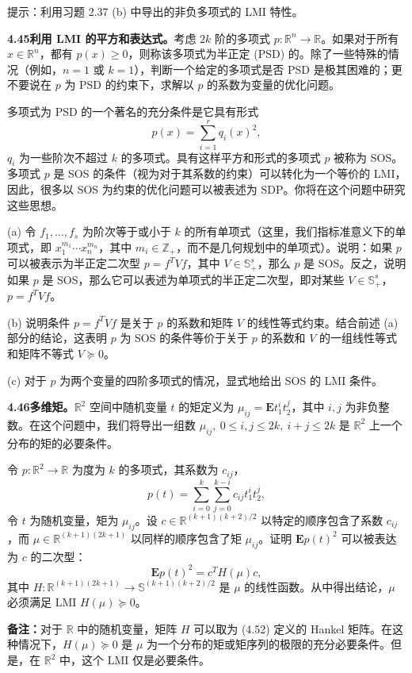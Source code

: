 \documentclass[UTF8,12pt,a4paper,fontset=fandol]{ctexart}
\begin{document}
提示：利用习题 2.37 (b) 中导出的非负多项式的 LMI 特性。

\noindent\textbf{4.45\quad 利用 LMI 的平方和表达式。}\quad 考虑 $2k$ 阶的多项式 $p:\mathbb{R}^n\to\mathbb{R}$。如果对于所有 $x\in\mathbb{R}^n$，都有 $p(x)\geq0$，则称该多项式为半正定 (PSD) 的。除了一些特殊的情况（例如，$n=1$ 或 $k=1$），判断一个给定的多项式是否 PSD 是极其困难的；更不要说在 $p$ 为 PSD 的约束下，求解以 $p$ 的系数为变量的优化问题。

多项式为 PSD 的一个著名的充分条件是它具有形式
\[
p(x)=\sum_{i=1}^r q_i(x)^2,
\]
$q_i$ 为一些阶次不超过 $k$ 的多项式。具有这样平方和形式的多项式 $p$ 被称为 SOS。多项式 $p$ 是 SOS 的条件（视为对于其系数的约束）可以转化为一个等价的 LMI，因此，很多以 SOS 为约束的优化问题可以被表述为 SDP。你将在这个问题中研究这些思想。

(a) 令 $f_1,\ldots,f_s$ 为阶次等于或小于 $k$ 的所有单项式（这里，我们指标准意义下的单项式，即 $x_1^{m_1}\cdots x_n^{m_n}$，其中 $m_i\in\mathbb{Z}_+$，而不是几何规划中的单项式）。说明：如果 $p$ 可以被表示为半正定二次型 $p=f^TVf$，其中 $V\in\mathbb{S}_+^s$，那么 $p$ 是 SOS。反之，说明如果 $p$ 是 SOS，那么它可以表述为单项式的半正定二次型，即对某些 $V\in\mathbb{S}_+^s$，$p=f^TVf$。

(b) 说明条件 $p=f^TVf$ 是关于 $p$ 的系数和矩阵 $V$ 的线性等式约束。结合前述 (a) 部分的结论，这表明 $p$ 为 SOS 的条件等价于关于 $p$ 的系数和 $V$ 的一组线性等式和矩阵不等式 $V\succeq0$。

(c) 对于 $p$ 为两个变量的四阶多项式的情况，显式地给出 SOS 的 LMI 条件。

\noindent\textbf{4.46\quad 多维矩。}\quad $\mathbb{R}^2$ 空间中随机变量 $t$ 的矩定义为 $\mu_{ij}=\mathbf{E}t_1^it_2^j$，其中 $i,j$ 为非负整数。在这个问题中，我们将导出一组数 $\mu_{ij},\ 0\leq i,j\leq 2k,\ i+j\leq2k$ 是 $\mathbb{R}^2$ 上一个分布的矩的必要条件。

令 $p:\mathbb{R}^2\to\mathbb{R}$ 为度为 $k$ 的多项式，其系数为 $c_{ij}$，
\[
p(t)=\sum_{i=0}^k\sum_{j=0}^{k-i}c_{ij}t_1^it_2^j,
\]
令 $t$ 为随机变量，矩为 $\mu_{ij}$。设 $c\in\mathbb{R}^{(k+1)(k+2)/2}$ 以特定的顺序包含了系数 $c_{ij}$，而 $\mu\in\mathbb{R}^{(k+1)(2k+1)}$ 以同样的顺序包含了矩 $\mu_{ij}$。证明 $\mathbf{E}p(t)^2$ 可以被表达为 $c$ 的二次型：
\[
\mathbf{E}p(t)^2=c^TH(\mu)c,
\]
其中 $H:\mathbb{R}^{(k+1)(2k+1)}\to\mathbb{S}^{(k+1)(k+2)/2}$ 是 $\mu$ 的线性函数。从中得出结论，$\mu$ 必须满足 LMI $H(\mu)\succeq0$。

\noindent\textbf{备注：}\quad 对于 $\mathbb{R}$ 中的随机变量，矩阵 $H$ 可以取为 (4.52) 定义的 Hankel 矩阵。在这种情况下，$H(\mu)\succeq0$ 是 $\mu$ 为一个分布的矩或矩序列的极限的充分必要条件。但是，在 $\mathbb{R}^2$ 中，这个 LMI 仅是必要条件。
\end{document}
